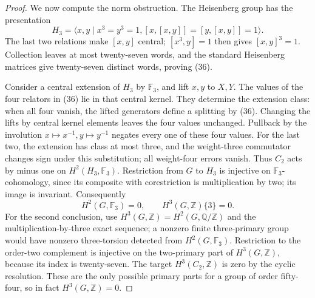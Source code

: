 \begin{proof}
We now compute the norm obstruction. The Heisenberg
group has the presentation
\[
 H_3=\langle x,y\mid x^3=y^3=1,
       [x,[x,y]]=[y,[x,y]]=1\rangle.                 \tag{36}
\]
The last two relations make \([x,y]\) central;
\([x^3,y]=1\) then gives \([x,y]^3=1\).
Collection leaves at most twenty-seven words,
and the standard Heisenberg matrices give
twenty-seven distinct words, proving (36).

Consider a central extension of \(H_3\) by
\(\mathbb F_3\), and lift \(x,y\) to \(X,Y\).
The values of the four relators in (36) lie in
that central kernel. They determine the extension
class: when all four vanish, the lifted generators
define a splitting by (36). Changing the lifts
by central kernel elements leaves the four values
unchanged. Pullback by the involution
\(x\mapsto x^{-1},y\mapsto y^{-1}\) negates
every one of these four values. For the last two,
the extension has class at most three, and the
weight-three commutator changes sign under this
substitution; all weight-four errors vanish.
Thus \(C_2\) acts by minus one on
\(H^2(H_3,\mathbb F_3)\).
Restriction from \(G\) to \(H_3\) is injective
on \(\mathbb F_3\)-cohomology, since its composite
with corestriction is multiplication by two;
its image is invariant. Consequently
\[
 H^2(G,\mathbb F_3)=0,
             \qquad H^3(G,\mathbb Z)\{3\}=0.        \tag{37}
\]
For the second conclusion, use
\(H^3(G,\mathbb Z)=H^2(G,\mathbb Q/\mathbb Z)\)
and the multiplication-by-three exact sequence;
a nonzero finite three-primary group would have
nonzero three-torsion detected from
\(H^2(G,\mathbb F_3)\).
Restriction to the order-two complement is injective
on the two-primary part of \(H^3(G,\mathbb Z)\),
because its index is twenty-seven. The target
\(H^3(C_2,\mathbb Z)\) is zero by the cyclic
resolution. These are the only possible primary
parts for a group of order fifty-four, so in fact
\(H^3(G,\mathbb Z)=0\).


\end{proof}
